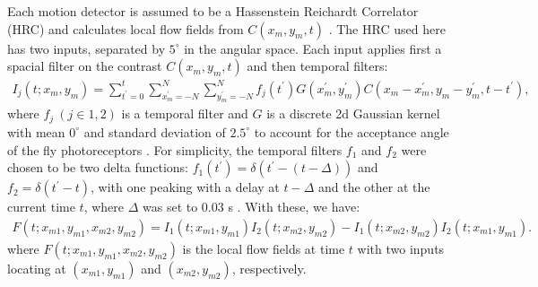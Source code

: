 \documentclass[pdftex,9pt,lineno]{elife}
\begin{document}
Each motion detector is assumed to be a Hassenstein Reichardt Correlator (HRC) and calculates local flow fields from $C(x_{m},y_{m},t)$ \citep{hassenstein1956systemtheoretische}. The HRC used here has two inputs, separated by $5^{\circ}$ in the angular space. Each input applies first a spacial filter on the contrast $C(x_{m},y_{m},t)$ and then temporal filters:
\begin{align}
I_{j}(t;x_{m},y_{m}) = \sum_{t^{'}=0}^{t}\sum_{x^{'}_{m}=-N}^{N}\sum_{y^{'}_{m}=-N}^{N}f_{j}(t^{'})G(x^{'}_{m},y^{'}_{m})C(x_{m}-x^{'}_{m},y_{m}-y^{'}_{m},t-t^{'}),
\end{align}
where $f_{j}\ (j \in {1,2})$ is a temporal filter and $G$ is a discrete 2d Gaussian kernel with mean $0^{\circ}$ and standard deviation of $2.5^{\circ}$ to account for the acceptance angle of the fly photoreceptors \citep{stavenga2003angular}. For simplicity, the temporal filters $f_{1}$ and $f_{2}$ were chosen to be two delta functions: $f_{1}(t^{'})=\delta (t^{'}-(t-\Delta))$ and $f_{2}=\delta (t^{'}-t)$, with one peaking with a delay at $t-\Delta$ and the other at the current time $t$, where $\Delta$ was set to 0.03 s \citep{salazar2016direct}. With these, we have:
\begin{align}\label{eq:HRC}
F(t;x_{m1},y_{m1},x_{m2},y_{m2}) = I_{1}(t;x_{m1},y_{m1})I_{2}(t;x_{m2},y_{m2})-I_{1}(t;x_{m2},y_{m2})I_{2}(t;x_{m1},y_{m1}).
\end{align}
where $F(t;x_{m1},y_{m1},x_{m2},y_{m2})$ is the local flow fields at time $t$ with two inputs locating at $(x_{m1},y_{m1})$ and $(x_{m2},y_{m2})$, respectively.
\end{document}
